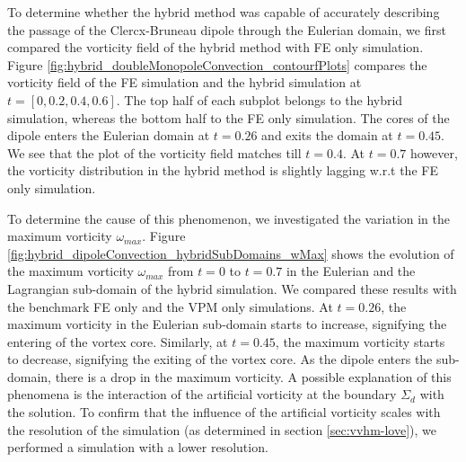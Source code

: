 To determine whether the hybrid method was capable of accurately describing the passage of the Clercx-Bruneau dipole through the Eulerian domain, we first compared the vorticity field of the hybrid method with FE only simulation. Figure \ref{fig:hybrid_doubleMonopoleConvection_contourfPlots} compares the vorticity field of the FE simulation and the hybrid simulation at $t=[0,0.2,0.4,0.6]$. The top half of each subplot belongs to the hybrid simulation, whereas the bottom half to the FE only simulation. The cores of the dipole enters the Eulerian domain at $t=0.26$ and exits the domain at $t=0.45$. We see that the plot of the vorticity field matches till $t=0.4$. At $t=0.7$ however, the vorticity distribution in the hybrid method is slightly lagging w.r.t the FE only simulation. 

To determine the cause of this phenomenon, we investigated the variation in the maximum vorticity $\omega_{max}$. Figure \ref{fig:hybrid_dipoleConvection_hybridSubDomains_wMax} shows the evolution of the maximum vorticity $\omega_{max}$ from $t=0$ to $t=0.7$ in the Eulerian and the Lagrangian sub-domain of the hybrid simulation. We compared these results with the benchmark FE only and the VPM only simulations. At $t=0.26$, the maximum vorticity in the Eulerian sub-domain starts to increase, signifying the entering of the vortex core. Similarly, at $t=0.45$, the maximum vorticity starts to decrease, signifying the exiting of the vortex core. As the dipole enters the sub-domain, there is a drop in the maximum vorticity. A possible explanation of this phenomena is the interaction of the artificial vorticity at the boundary $\Sigma_d$ with the solution. To confirm that the influence of the artificial vorticity scales with the resolution of the simulation (as determined in section \ref{sec:vvhm-love}), we performed a simulation with a lower resolution.

	

